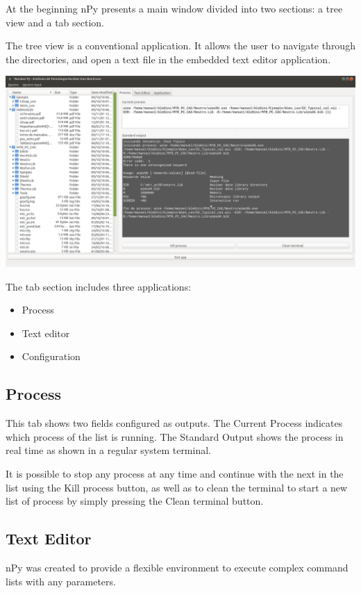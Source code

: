 \documentclass[a4paper,10pt]{article}
\begin{document}
At the beginning nPy presents a main window divided into two sections: a tree view and a tab section.

The tree view is a conventional application. It allows the user to navigate through the directories, and open a text file in the embedded text editor application.

\begin{center}
 \includegraphics[width=\textwidth]{img/mainWindow.png}
\end{center}

\noindent The tab section includes three applications:

\begin{itemize}
 \item Process
 \item Text editor
 \item Configuration
\end{itemize}

\subsection{Process}
This tab shows two fields configured as outputs. The Current Process indicates which process of the list is running. The Standard Output shows the process in real time as shown in a regular system terminal.

It is possible to stop any process at any time and continue with the next in the list using the Kill process button, as well as to clean the terminal to start a new list of process by simply pressing the Clean terminal button.

\subsection{Text Editor}
nPy was created to provide a flexible environment to execute complex command lists with any parameters. 
\end{document}
